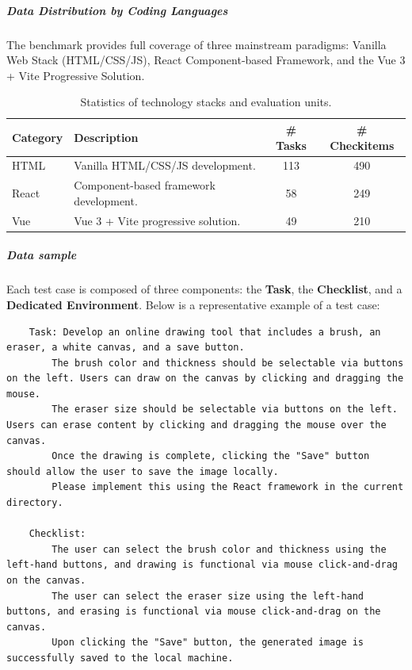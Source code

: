 \subparagraph{Data Distribution by Coding Languages}
The benchmark provides full coverage of three mainstream paradigms: Vanilla Web Stack (HTML/CSS/JS), React Component-based Framework, and the Vue 3 + Vite Progressive Solution.
\begin{table}[h]
\centering
\caption{Statistics of technology stacks and evaluation units.}
\begin{tabular}{llcc}
\toprule
\textbf{Category} & \textbf{Description} & \textbf{\# Tasks} & \textbf{\# Checkitems} \\
\midrule
HTML & Vanilla HTML/CSS/JS development. & 113 & 490 \\
React & Component-based framework development. & 58 & 249 \\
Vue & Vue 3 + Vite progressive solution. & 49 & 210 \\
\bottomrule
\end{tabular}
\end{table}

\subparagraph{Data sample}
Each test case is composed of three components: the \textbf{Task}, the \textbf{Checklist}, and a \textbf{Dedicated Environment}. Below is a representative example of a test case:
\begin{tcolorbox}[left=0mm,right=0mm,top=0mm,bottom=0mm,boxsep=1mm,arc=0mm,boxrule=0pt, frame empty, breakable]
\footnotesize
\begin{lstlisting}
    Task: Develop an online drawing tool that includes a brush, an eraser, a white canvas, and a save button.
        The brush color and thickness should be selectable via buttons on the left. Users can draw on the canvas by clicking and dragging the mouse.
        The eraser size should be selectable via buttons on the left. Users can erase content by clicking and dragging the mouse over the canvas.
        Once the drawing is complete, clicking the "Save" button should allow the user to save the image locally.
        Please implement this using the React framework in the current directory.

    Checklist:
        The user can select the brush color and thickness using the left-hand buttons, and drawing is functional via mouse click-and-drag on the canvas.
        The user can select the eraser size using the left-hand buttons, and erasing is functional via mouse click-and-drag on the canvas.
        Upon clicking the "Save" button, the generated image is successfully saved to the local machine.
\end{lstlisting}
\end{tcolorbox}
\noindent\begin{minipage}{\textwidth}
\end{minipage}


